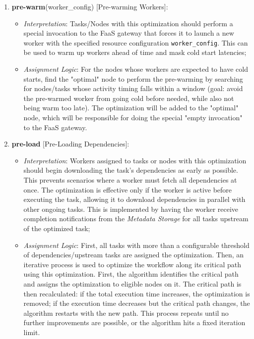 \documentclass[conference]{IEEEtran}
\begin{document}
\begin{enumerate}
\item\textbf{pre-warm}(worker\_config) [Pre-warming Workers]:
\begin{itemize}
  \item \textit{Interpretation}: Tasks/Nodes with this optimization should perform a special invocation to the FaaS gateway that forces it to launch a new worker with the specified resource configuration \texttt{worker\_config}. This can be used to warm up workers ahead of time and mask cold start latencies;
  \item \textit{Assignment Logic}: For the nodes whose workers are expected to have cold starts, find the "optimal" node to perform the pre-warming by searching for nodes/tasks whose activity timing falls within a window (goal: avoid the pre-warmed worker from going cold before needed, while also not being warm too late). The optimization will be added to the "optimal" node, which will be responsible for doing the special "empty invocation" to the FaaS gateway.
\end{itemize}

\item\textbf{pre-load} [Pre-Loading Dependencies]:
\begin{itemize}
  \item \textit{Interpretation}: Workers assigned to tasks or nodes with this optimization should begin downloading the task's dependencies as early as possible. This prevents scenarios where a worker must fetch all dependencies at once. The optimization is effective only if the worker is active before executing the task, allowing it to download dependencies in parallel with other ongoing tasks. This is implemented by having the worker receive completion notifications from the \textit{Metadata Storage} for all tasks upstream of the optimized task;
  \item \textit{Assignment Logic}: First, all tasks with more than a configurable threshold of dependencies/upstream tasks are assigned the optimization. Then, an iterative process is used to optimize the workflow along its critical path using this optimization. First, the algorithm identifies the critical path and assigns the optimization to eligible nodes on it. The critical path is then recalculated: if the total execution time increases, the optimization is removed; if the execution time decreases but the critical path changes, the algorithm restarts with the new path. This process repeats until no further improvements are possible, or the algorithm hits a fixed iteration limit.
\end{itemize}


\end{enumerate}
\end{document}
